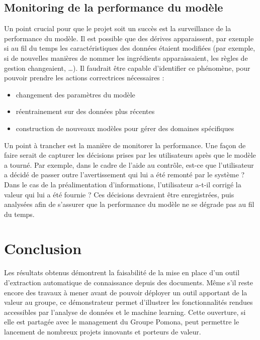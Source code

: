             \subsection{Monitoring de la performance du modèle}

            Un point crucial pour que le projet soit un succès est la surveillance de la performance du modèle.
            Il est possible que des dérives apparaissent, par exemple si au fil du temps les caractéristiques des données étaient modifiées (par exemple, si de nouvelles manières de nommer les ingrédients apparaissaient, les règles de gestion changeaient, \dots).
            Il faudrait être capable d'identifier ce phénomène, pour pouvoir prendre les actions correctrices nécessaires : 
            \begin{itemize}
                \item changement des paramètres du modèle
                \item réentrainement sur des données plus récentes
                \item construction de nouveaux modèles pour gérer des domaines spécifiques
            \end{itemize}
            Un point à trancher est la manière de monitorer la performance.
            Une façon de faire serait de capturer les décisions prises par les utilisateurs après que le modèle a tourné.
            Par exemple, dans le cadre de l'aide au contrôle, est-ce que l'utilisateur a décidé de passer outre l'avertissement qui lui a été remonté par le système ?
            Dans le cas de la préalimentation d'informations, l'utilisateur a-t-il corrigé la valeur qui lui a été fournie ?
            Ces décisions devraient être enregistrées, puis analysées afin de s'assurer que la performance du modèle ne se dégrade pas au fil du temps.
            
            \section{Conclusion}

            Les résultats obtenus démontrent la faisabilité de la mise en place d'un outil d'extraction automatique de connaissance depuis des documents.
            Même s'il reste encore des travaux à mener avant de pouvoir déployer un outil apportant de la valeur au groupe, ce démonstrateur permet d'illustrer les fonctionnalités rendues accessibles par l'analyse de données et le machine learning.
            Cette ouverture, si elle est partagée avec le management du Groupe Pomona, peut permettre le lancement de nombreux projets innovants et porteurs de valeur.
